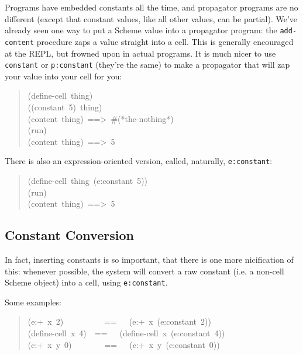 \documentclass[12pt,letterpaper,english]{article}
\begin{document}
Programs have embedded constants all the time, and propagator programs
are no different (except that constant values, like all other values,
can be partial).  We've already seen one way to put a Scheme value
into a propagator program: the \texttt{add-content} procedure zaps a value
straight into a cell.  This is generally encouraged at the REPL, but
frowned upon in actual programs.  It is much nicer to use \texttt{constant}
or \texttt{p:constant} (they're the same) to make a propagator that will
zap your value into your cell for you:
\begin{quote}{\ttfamily \raggedright \noindent
(define-cell~thing)~\\
((constant~5)~thing)~\\
(content~thing)~==>~{\#}(*the-nothing*)~\\
(run)~\\
(content~thing)~==>~5
}\end{quote}

There is also an expression-oriented version, called, naturally,
\texttt{e:constant}:
\begin{quote}{\ttfamily \raggedright \noindent
(define-cell~thing~(e:constant~5))~\\
(run)~\\
(content~thing)~==>~5
}\end{quote}



\subsection{Constant Conversion}
\label{constant-conversion}

In fact, inserting constants is so important, that there is one more
nicification of this: whenever possible, the system will convert a raw
constant (i.e. a non-cell Scheme object) into a cell, using
\texttt{e:constant}.

Some examples:
\begin{quote}{\ttfamily \raggedright \noindent
(e:+~x~2)~~~~~~~~~~==~~~(e:+~x~(e:constant~2))~\\
(define-cell~x~4)~~==~~~(define-cell~x~(e:constant~4))~\\
(c:+~x~y~0)~~~~~~~~==~~~(c:+~x~y~(e:constant~0))
}\end{quote}


\end{document}
